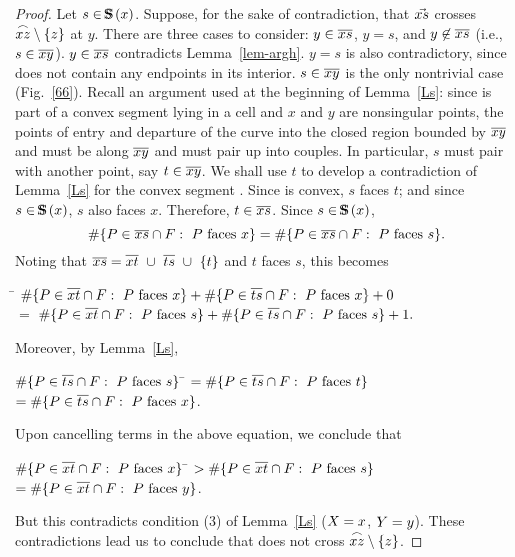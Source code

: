 \begin{proof}
Let $s \in \mbox{S\hspace{-0.68em}S\hspace{.25em}}(x)$.
Suppose, for the sake of contradiction, that $\mbox{$\vec{xs}$}$ crosses 
$\mbox{$\stackrel{\frown}{xz}$} \setminus \{z\}$ at $y$.
\label{thpr}
There are three cases to consider: $y \in \mbox{$\overline{xs}$}$, $y = s$, and $y \not\in \mbox{$\overline{xs}$}$
(i.e., $s \in \mbox{$\overline{xy}$}$).
$y \in \mbox{$\overline{xs}$}$ contradicts Lemma~\ref{lem-argh}.
$y = s$ is also contradictory, since  does not contain any endpoints in its 
interior.
$s \in \mbox{$\overline{xy}$}$ is the only nontrivial case (Fig.~\ref{66}).
Recall an argument used at the beginning of Lemma~\ref{Ls}:
since  is part of a convex segment lying in a cell
and $x$ and $y$ are nonsingular points,
the points of entry and departure of the curve into
the closed region bounded by $\mbox{$\overline{xy}$}$ and 
must be along $\mbox{$\overline{xy}$}$ and must pair up into couples.
In particular, $s$ must pair with another point, say $t \in \mbox{$\overline{xy}$}$.
We shall use $t$ to develop a contradiction of Lemma~\ref{Ls} for the convex 
segment .
Since  is convex, $s$ faces $t$; and since $s \in \mbox{S\hspace{-0.68em}S\hspace{.25em}}(x)$, $s$ also faces $x$. 
Therefore, $t \in \mbox{$\overline{xs}$}$.
Since \mbox{$s \in \mbox{S\hspace{-0.68em}S\hspace{.25em}}(x)$}, 
\[ \#\{P \in \mbox{$\overline{xs}$} \cap F: \mbox{ $P$ faces $x$}\}
= \#\{P \in \mbox{$\overline{xs}$} \cap F: \mbox{ $P$ faces $s$}\}. \]
Noting that $\seg{xs} = \seg{xt}\ \cup\ \seg{ts}\ \cup\ \{t\}$ and 
$t$ faces $s$, this becomes 
%
\vspace{.1in}
\begin{tabbing}
\hspace{.7in} \= $\#\{P \in \mbox{$\overline{xt}$} \cap F: \mbox{ $P$ faces $x$}\} +
\#\{P \in \mbox{$\overline{ts}$} \cap F: \mbox{ $P$ faces $x$}\} + 0$ \\
\nopagebreak
\hspace{.5in} $=$ \> $\#\{P \in \mbox{$\overline{xt}$} \cap F: \mbox{ $P$ faces $s$}\} +
\#\{P \in \mbox{$\overline{ts}$} \cap F: \mbox{ $P$ faces $s$}\} + 1.$
\end{tabbing}
\vspace{.1in}
%
Moreover, by Lemma~\ref{Ls},
%
\vspace{.05in}
\begin{tabbing}
\hspace{.7in} $\#\{P \in \mbox{$\overline{ts}$} \cap F: \mbox{ $P$ faces } s\}$ 
   \= $= \#\{P \in \mbox{$\overline{ts}$} \cap F: \mbox{ $P$ faces } t\}$ \\
\> $= \#\{P \in \mbox{$\overline{ts}$} \cap F: \mbox{ $P$ faces } x\}$.
\end{tabbing}
\vspace{.05in}
%
Upon cancelling terms in the above equation, we conclude that
%
\vspace{.05in}
\begin{tabbing}
\hspace{.7in} $\#\{P \in \mbox{$\overline{xt}$} \cap F: \mbox{ $P$ faces } x\}$ \=
   $> \#\{P \in \mbox{$\overline{xt}$} \cap F: \mbox{ $P$ faces } s\}$ \\
\> $= \#\{P \in \mbox{$\overline{xt}$} \cap F: \mbox{ $P$ faces } y\}$.
\end{tabbing}
\vspace{.05in}
%
But this contradicts condition (3) of Lemma~\ref{Ls} 
($X = x$, $Y = y$).
These contradictions lead us to conclude that  does not cross 
$\mbox{$\stackrel{\frown}{xz}$} \setminus \{z\}$.
\end{proof}

